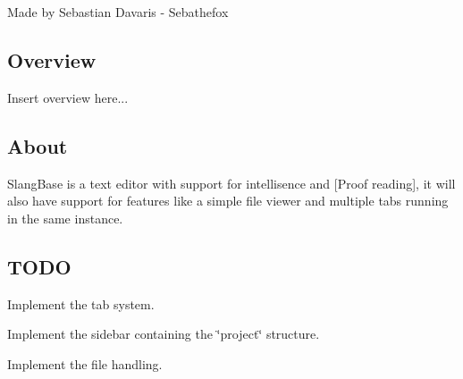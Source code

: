 
\footnotesize Made by Sebastian Davaris -\/ Sebathefox
\normalsize 

\subsection*{Overview}

Insert overview here...

\subsection*{About}

Slang\+Base is a text editor with support for intellisence and \mbox{[}Proof reading\mbox{]}, it will also have support for features like a simple file viewer and multiple tabs running in the same instance.

\subsection*{T\+O\+DO}


\begin{DoxyItemize}
\item Implement the tab system.
\item Implement the sidebar containing the \char`\"{}project\char`\"{} structure.
\item Implement the file handling. 
\end{DoxyItemize}